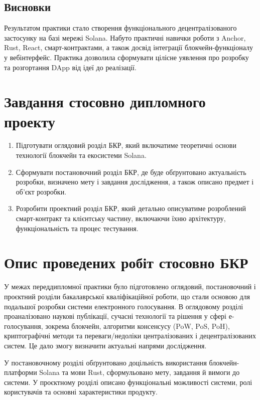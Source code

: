 \documentclass[14pt]{extreport}
\begin{document}
\subsection{Висновки}

Результатом практики стало створення функціонального децентралізованого застосунку на базі мережі Solana. Набуто практичні навички роботи з Anchor, Rust, React, смарт-контрактами, а також досвід інтеграції блокчейн-функціоналу у вебінтерфейс. Практика дозволила сформувати цілісне уявлення про розробку та розгортання DApp від ідеї до реалізації.


\section{Завдання стосовно дипломного проекту}

\begin{enumerate}
    \item Підготувати оглядовий розділ БКР, який включатиме теоретичні основи технології блокчейн та екосистеми Solana.
    \item Сформувати постановочний розділ БКР, де буде обґрунтовано актуальність розробки, визначено мету і завдання дослідження, а також описано предмет і об'єкт розробки.
    \item Розробити проектний розділ БКР, який детально описуватиме розроблений смарт-контракт та клієнтську частину, включаючи їхню архітектуру, функціональність та процес тестування.
\end{enumerate}

\section{Опис проведених робіт стосовно БКР}

У межах переддипломної практики було підготовлено оглядовий, постановочний і проєктний розділи бакалаврської кваліфікаційної роботи, що стали основою для подальшої розробки системи електронного голосування. В оглядовому розділі проаналізовано наукові публікації, сучасні технології та рішення у сфері е-голосування, зокрема блокчейн, алгоритми консенсусу (PoW, PoS, PoH), криптографічні методи та переваги/недоліки централізованих і децентралізованих систем. Це дало змогу визначити актуальні напрями дослідження.

У постановочному розділі обґрунтовано доцільність використання блокчейн-платформи Solana та мови Rust, сформульовано мету, завдання й вимоги до системи. У проєктному розділі описано функціональні можливості системи, ролі користувачів та основні характеристики продукту.
\end{document}
